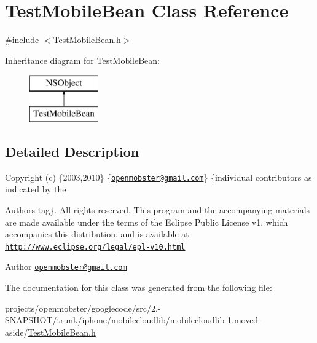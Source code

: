 \hypertarget{interface_test_mobile_bean}{
\section{\-Test\-Mobile\-Bean \-Class \-Reference}
\label{interface_test_mobile_bean}
}


{\ttfamily \#include $<$\-Test\-Mobile\-Bean.\-h$>$}

\-Inheritance diagram for \-Test\-Mobile\-Bean\-:\begin{figure}[H]
\begin{center}
\leavevmode
\includegraphics[height=2.000000cm]{interface_test_mobile_bean}
\end{center}
\end{figure}


\subsection{\-Detailed \-Description}
\-Copyright (c) \{2003,2010\} \{\href{mailto:openmobster@gmail.com}{\tt openmobster@gmail.\-com}\} \{individual contributors as indicated by the \begin{DoxyAuthor}{\-Authors}
tag\}. \-All rights reserved. \-This program and the accompanying materials are made available under the terms of the \-Eclipse \-Public \-License v1. which accompanies this distribution, and is available at \href{http://www.eclipse.org/legal/epl-v10.html}{\tt http\-://www.\-eclipse.\-org/legal/epl-\/v10.\-html}
\end{DoxyAuthor}
\begin{DoxyAuthor}{\-Author}
\href{mailto:openmobster@gmail.com}{\tt openmobster@gmail.\-com} 
\end{DoxyAuthor}


\-The documentation for this class was generated from the following file\-:\begin{DoxyCompactItemize}
\item 
projects/openmobster/googlecode/src/2.-\/\-S\-N\-A\-P\-S\-H\-O\-T/trunk/iphone/mobilecloudlib/mobilecloudlib-\/1.\-moved-\/aside/\hyperlink{mobilecloudlib-1_8moved-aside_2_test_mobile_bean_8h}{\-Test\-Mobile\-Bean.\-h}\end{DoxyCompactItemize}
